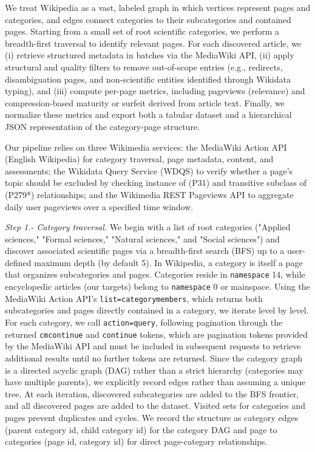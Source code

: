 We treat Wikipedia as a vast, labeled graph in which vertices represent pages and categories, and edges connect categories to their subcategories and contained pages. Starting from a small set of root scientific categories, we perform a breadth-first traversal to identify relevant pages. For each discovered article, we (i) retrieve structured metadata in batches via the MediaWiki API, (ii) apply structural and quality filters to remove out-of-scope entries (e.g., redirects, disambiguation pages, and non-scientific entities identified through Wikidata typing), and (iii) compute per-page metrics, including pageviews (relevance) and compression-based maturity or surfeit derived from article text. Finally, we normalize these metrics and export both a tabular dataset and a hierarchical JSON representation of the category-page structure.

Our pipeline relies on three Wikimedia services: the MediaWiki Action API (English Wikipedia) for category traversal, page metadata, content, and assessments; the Wikidata Query Service (WDQS) to verify whether a page's topic should be excluded by checking instance of (P31) and transitive subclass of (P279*) relationships; and the Wikimedia REST Pageviews API to aggregate daily user pageviews over a specified time window. 

\emph{Step 1.- Category traversal.} We begin with a list of root categories ("Applied sciences," "Formal sciences," "Natural sciences," and "Social sciences") and discover associated scientific pages via a breadth-first search (BFS) up to a user-defined maximum depth (by default 5). In Wikipedia, a category is itself a page that organizes subcategories and pages. Categories reside in \texttt{namespace} 14, while encyclopedic articles (our targets) belong to \texttt{namespace} 0 or mainspace. Using the MediaWiki Action API's \texttt{list=categorymembers}, which returns both subcategories and pages directly contained in a category, we iterate level by level. For each category, we call \texttt{action=query}, following pagination through the returned \texttt{cmcontinue} and \texttt{continue} tokens, which are pagination tokens provided by the MediaWiki API and must be included in subsequent requests to retrieve additional results until no further tokens are returned. Since the category graph is a directed acyclic graph (DAG) rather than a strict hierarchy (categories may have multiple parents), we explicitly record edges rather than assuming a unique tree. At each iteration, discovered subcategories are added to the BFS frontier, and all discovered pages are added to the dataset. Visited sets for categories and pages prevent duplicates and cycles. We record the structure as category edges (parent category id, child category id) for the category DAG and page to categories (page id, category id) for direct page-category relationships.

